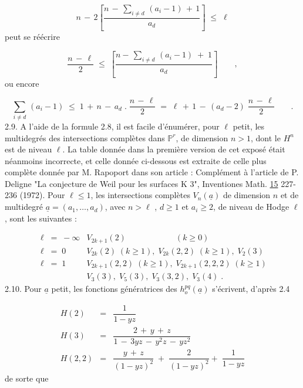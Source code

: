 \begin{equation*}
n \, - \, 2 \left[ \frac{n \, - \, \sum_{i \neq d} \, (a_i - 1) \, + \, 1}{a_d} \right] \;\leq\; \ell
\end{equation*}
peut se réécrire

\begin{equation*}
\frac{n \, - \, \ell}{2} \;\leq\; \left[ \frac{n - \, \sum_{i \neq d} \, (a_i - 1) \; + \; 1}{a_d} \right] \qquad ,
\end{equation*}
ou encore

\begin{equation*}
\sum_{i \neq d} \, (a_i - 1) \;\leq\; 1 \, + \, n \, - \, a_d \; . \; \frac{n \, - \, \ell}{2} \;=\; \ell \, + \, 1 \, - \, (a_d - 2) \; \frac{n \, - \, \ell}{2} \qquad .
\end{equation*}
2.9. \quad A l'aide de la formule 2.8, il est facile d'énumérer, pour $\ell$ petit, les multidegrés des intersections complètes dans $\mathbb{P}^r$, de dimension $n > 1$, dont le $H^n$ est de niveau $\ell$. La table donnée dans la première version de cet exposé était néanmoins incorrecte, et celle donnée ci-dessous est extraite de celle plus complète donnée par M. Rapoport dans son article : Complément à l'article de P. Deligne "La conjecture de Weil pour les surfaces K 3", Inventiones Math. \underline{15} 227-236 (1972). Pour $\ell \leq 1$, les intersections complètes $V_n(\underline{a})$ de dimension $n$ et de multidegré $\underline{a} = (a_1,\ldots,a_d)$, avec $n > \ell$ , $d \geq 1$ et $a_i \geq 2$, de niveau de Hodge $\ell$ , sont les suivantes :



\begin{equation*}
\begin{array}{ll}
\ell \;=\; -\infty & V_{2k+1}(2) \qquad\qquad\qquad (k \geq 0) \\[2ex]
\ell \;=\; 0 & V_{2k}(2) \; (k \geq 1), \; V_{2k}(2,2) \; (k \geq 1), \; V_2(3) \\[2ex]
\ell \;=\; 1 & V_{2k+1}(2,2) \; (k \geq 1), \; V_{2k+1}(2,2,2) \; (k \geq 1) \\
& V_3(3), \; V_5(3), \; V_3(3,2), \; V_3(4) \; .
\end{array}
\end{equation*}
2.10. \quad Pour $\underline{a}$ petit, les fonctions génératrices des $h_o^{pq}(\underline{a})$ s'écrivent, d'après 2.4

\begin{equation*}
\begin{array}{rcl}
H(2) & = & \dfrac{1}{1-yz} \\[3ex]
H(3) & = & \dfrac{2 \, + \, y \, + \, z}{1 \, - \, 3yz \, - \, y^2 z \, - \, yz^2} \\[3ex]
H(2,2) & = & \dfrac{y \, + \, z}{(1-yz)^2} \; + \; \dfrac{2}{(1-yz)^2} + \; \dfrac{1}{1-yz}
\end{array}
\end{equation*}
de sorte que

